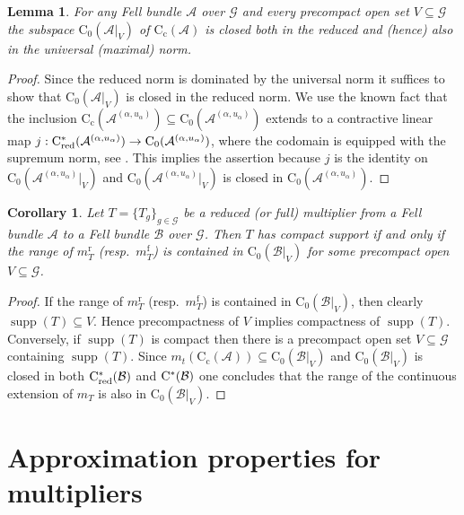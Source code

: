 \documentclass[11 pt, leqno]{amsart}
\numberwithin{equation}{section}
\theoremstyle{plain}
\newtheorem {lem} [thm]{Lemma}
\newtheorem{cor}[thm]{Corollary}
\theoremstyle{definition}
\newcommand*{\contc}{\mathrm{C_c}}%
\newcommand*{\contz}{\mathrm{C_0}}%
\DeclareMathOperator{\red}{red}%
\DeclareMathOperator{\rd}{r}%
\DeclareMathOperator{\f}{f}%
\DeclareMathOperator{\supp}{supp}
\newcommand{\B}{\mathcal B}
\newcommand{\m}{m}
\newcommand{\G}{\mathcal G} %
\newcommand{\A}{\mathcal A}
\newcommand{\cst}{\ifmmode\mathrm{C}^*\else{$\mathrm{C}^*$}\fi}
\begin{document}
\begin{lem}\label{lem:precompacts_embed_into_crossed_products}
For any Fell bundle $\A$ over $\G$ and every precompact open set $V\subseteq \G$ the subspace $\contz(\A|_{V})$ of $\contc(\A)$ is closed both in the reduced and (hence) also in the universal (maximal) norm.
\end{lem}
\begin{proof}
Since the reduced norm is dominated by the universal norm it suffices to show that  $\contz(\A|_{V})$ is closed in the reduced norm.
We use the known fact that the inclusion $\contc(\A^{(\alpha,u_{\alpha})}) \subseteq \contz(\A^{(\alpha,u_{\alpha})})$ extends to a contractive linear map $j : \cst_{\red}(\A^{(\alpha,u_{\alpha})}) \to \contz(\A^{(\alpha,u_{\alpha})})$, where the codomain is equipped with the supremum norm, see \cite[Proposition 7.10]{BartoszRalf2}. 
This implies the assertion because $j$ is the identity on $\contz(\A^{(\alpha,u_{\alpha})}|_{V})$ and $\contz(\A^{(\alpha,u_{\alpha})}|_{V})$ is closed in $\contz(\A^{(\alpha,u_{\alpha})})$.
\end{proof} 

\begin{cor}\label{cor:compactly_supported_vs_range}
Let $T = \{ T_g \}_{g\in \G}$ be a reduced (or full) multiplier from a Fell bundle $\A$ to a Fell bundle $\B$ over $\G$. 
Then $T$ has compact support if and only if the range of $\m_T^{\rd}$ (resp.\ $\m_T^{\f}$) is contained in  $\contz(\B|_{V})$ for some precompact open $V\subseteq \G$.
\end{cor}
\begin{proof}
If the range of $\m_T^{\rd}$ (resp.\ $\m_T^{\f}$) is contained in  $\contz(\B|_{V})$, then clearly $\supp (T)\subseteq V$. 
Hence precompactness of $V$ implies compactness of $\supp (T)$. 
Conversely, if $\supp (T)$ is compact then there is a precompact open set $V\subseteq \G$ containing $\supp (T)$. 
Since $\m_t(\contc(\A))\subseteq \contz(\B|_V)$ and $\contz(\B|_V)$ is closed in both $\cst_{\red}(\B)$ and $\cst(\B)$ one concludes that the range of the continuous extension of $\m_T$ is also in $\contz(\B|_V)$.
\end{proof}



%
%
\section{Approximation properties for multipliers}
\label{Sec:Applicationapproximation}
\end{document}
